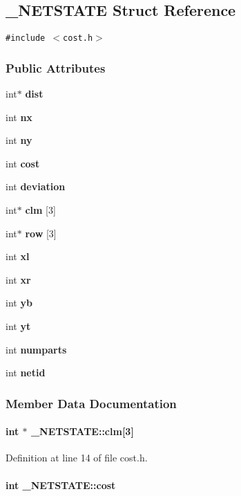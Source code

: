 \subsection{\_\-NETSTATE  Struct Reference}
\label{_NETSTATE}
{\tt \#include $<$cost.h$>$}

\subsubsection*{Public Attributes}
\begin{CompactItemize}
\item 
int$\ast$ {\bf dist}
\item 
int {\bf nx}
\item 
int {\bf ny}
\item 
int {\bf cost}
\item 
int {\bf deviation}
\item 
int$\ast$ {\bf clm} [3]
\item 
int$\ast$ {\bf row} [3]
\item 
int {\bf xl}
\item 
int {\bf xr}
\item 
int {\bf yb}
\item 
int {\bf yt}
\item 
int {\bf numparts}
\item 
int {\bf netid}
\end{CompactItemize}


\subsubsection{Member Data Documentation}
\label{_NETSTATE_m5}
\paragraph{\setlength{\rightskip}{0pt plus 5cm}int $\ast$ \_\-NETSTATE::clm[3]}\hfill



Definition at line 14 of file cost.h.\label{_NETSTATE_m3}
\paragraph{\setlength{\rightskip}{0pt plus 5cm}int \_\-NETSTATE::cost}\hfill



